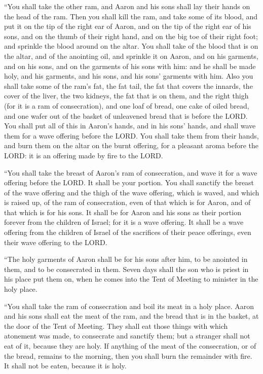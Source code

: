  ``You shall take the other ram, and Aaron and his sons
shall lay their hands on the head of the ram.  Then you
shall kill the ram, and take some of its blood, and put it on the tip of
the right ear of Aaron, and on the tip of the right ear of his sons, and
on the thumb of their right hand, and on the big toe of their right
foot; and sprinkle the blood around on the altar.  You
shall take of the blood that is on the altar, and of the anointing oil,
and sprinkle it on Aaron, and on his garments, and on his sons, and on
the garments of his sons with him: and he shall be made holy, and his
garments, and his sons, and his sons' garments with him. 
Also you shall take some of the ram's fat, the fat tail, the fat that
covers the innards, the cover of the liver, the two kidneys, the fat
that is on them, and the right thigh (for it is a ram of consecration),
 and one loaf of bread, one cake of oiled bread, and one
wafer out of the basket of unleavened bread that is before the LORD.
 You shall put all of this in Aaron's hands, and in his
sons' hands, and shall wave them for a wave offering before the LORD.
 You shall take them from their hands, and burn them on the
altar on the burnt offering, for a pleasant aroma before the LORD: it is
an offering made by fire to the LORD.

 ``You shall take the breast of Aaron's ram of
consecration, and wave it for a wave offering before the LORD. It shall
be your portion.  You shall sanctify the breast of the wave
offering and the thigh of the wave offering, which is waved, and which
is raised up, of the ram of consecration, even of that which is for
Aaron, and of that which is for his sons.  It shall be for
Aaron and his sons as their portion forever from the children of Israel;
for it is a wave offering. It shall be a wave offering from the children
of Israel of the sacrifices of their peace offerings, even their wave
offering to the LORD.

 ``The holy garments of Aaron shall be for his sons after
him, to be anointed in them, and to be consecrated in them.
 Seven days shall the son who is priest in his place put
them on, when he comes into the Tent of Meeting to minister in the holy
place.

 ``You shall take the ram of consecration and boil its meat
in a holy place.  Aaron and his sons shall eat the meat of
the ram, and the bread that is in the basket, at the door of the Tent of
Meeting.  They shall eat those things with which atonement
was made, to consecrate and sanctify them; but a stranger shall not eat
of it, because they are holy.  If anything of the meat of
the consecration, or of the bread, remains to the morning, then you
shall burn the remainder with fire. It shall not be eaten, because it is
holy.


